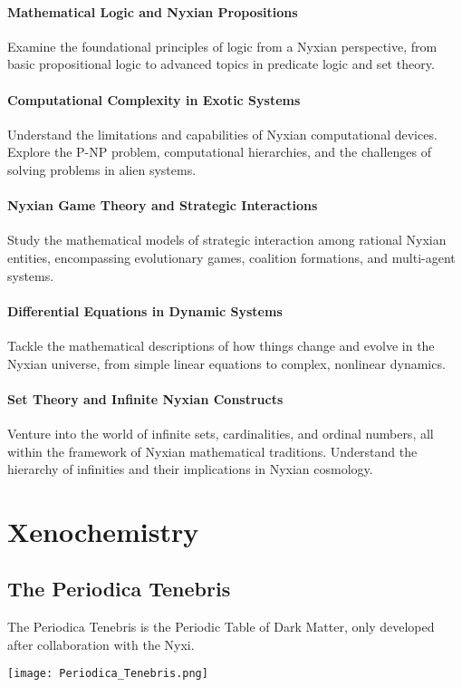 \subsubsection{Mathematical Logic and Nyxian Propositions}
Examine the foundational principles of logic from a Nyxian perspective, from basic propositional logic to advanced topics in predicate logic and set theory.
\subsubsection{Computational Complexity in Exotic Systems}
Understand the limitations and capabilities of Nyxian computational devices. Explore the P-NP problem, computational hierarchies, and the challenges of solving problems in alien systems.
\subsubsection{Nyxian Game Theory and Strategic Interactions}
Study the mathematical models of strategic interaction among rational Nyxian entities, encompassing evolutionary games, coalition formations, and multi-agent systems.
\subsubsection{Differential Equations in Dynamic Systems}
Tackle the mathematical descriptions of how things change and evolve in the Nyxian universe, from simple linear equations to complex, nonlinear dynamics.
\subsubsection{Set Theory and Infinite Nyxian Constructs}
Venture into the world of infinite sets, cardinalities, and ordinal numbers, all within the framework of Nyxian mathematical traditions. Understand the hierarchy of infinities and their implications in Nyxian cosmology.


\chapter{Xenochemistry}

\section{The Periodica Tenebris}\label{PeriodicaTenebris}

The Periodica Tenebris is the Periodic Table of Dark Matter, only developed after collaboration with the Nyxi.
\\
\begin{center}
  \texttt{[image: Periodica\_Tenebris.png]}
\end{center}

